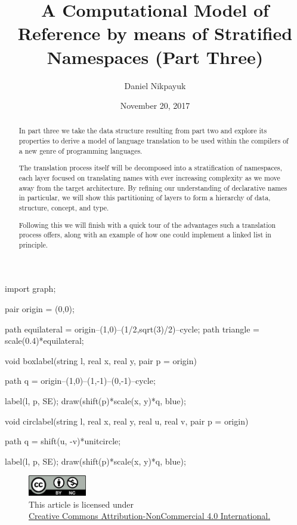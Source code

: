 \documentclass[twoside]{article}
\title{A Computational Model of Reference by means of Stratified Namespaces (Part Three)}
\author{Daniel Nikpayuk}
\date{November 20, 2017}
\begin{document}
\maketitle
\thispagestyle{empty}

\begin{asydef}
import graph;

pair origin = (0,0);

path equilateral = origin--(1,0)--(1/2,sqrt(3)/2)--cycle;
path triangle = scale(0.4)*equilateral;

void boxlabel(string l, real x, real y, pair p = origin)
{
	path q = origin--(1,0)--(1,-1)--(0,-1)--cycle;

	label(l, p, SE);
	draw(shift(p)*scale(x, y)*q, blue);
}

void circlabel(string l, real x, real y, real u, real v, pair p = origin)
{
	path q = shift(u, -v)*unitcircle;

	label(l, p, SE);
	draw(shift(p)*scale(x, y)*q, blue);
}

\end{asydef}

\begin{figure}[h]
\centering
\includegraphics[width=1in]{../../../cc-by-nc.png}\\[0.1in]
\tiny This article is licensed under \\
\href{http://creativecommons.org/licenses/by-nc/4.0/}
{Creative Commons Attribution-NonCommercial 4.0 International.}\\[0.3in]
\end{figure}

\begin{abstract}
In part three we take the data structure resulting from part two and explore its properties to derive
a model of language translation to be used within the compilers of a new genre of programming languages.

The translation process itself will be decomposed into a stratification of namespaces, each layer
focused on translating names with ever increasing complexity as we move away from the target architecture.
By refining our understanding of declarative names in particular, we will show this partitioning of layers
to form a hierarchy of data, structure, concept, and type.

Following this we will finish with a quick tour of the advantages such a translation process offers,
along with an example of how one could implement a linked list in principle.
\end{abstract}
\end{document}
